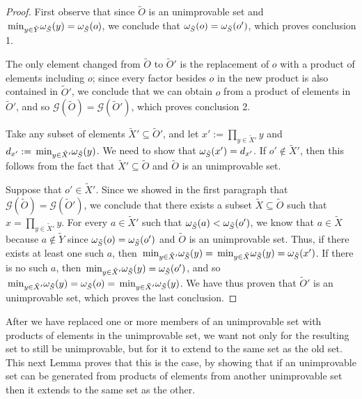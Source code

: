 \documentclass[twocolumn,showpacs,preprintnumbers,amsmath,amssymb,nofootinbib,pra,floatfix]{revtex4-1}
\newenvironment{remark}[1][Remark]{\begin{trivlist}
\item[\hskip \labelsep {\bfseries #1}]}{\end{trivlist}}
\newcommand{\set}{\tilde}
\newcommand{\genfun}{\mathcal{G}}
\begin{document}
\begin{proof}
First observe that since $\set O$ is an unimprovable set and $\min_{y\in\set Y}\om_{\set S}(y)=\om_{\set S}(o)$, we conclude that $\om_{\set S}(o)=\om_{\set S}(o')$, which proves conclusion 1.

The only element changed from $\set O$ to $\set O'$ is the replacement of $o$ with a product of elements including $o$;  since every factor besides $o$ in the new product is also contained in $\set O'$, we conclude that we can obtain $o$ from a product of elements in $\set O'$, and so $\genfun(\set O)=\genfun(\set O')$, which proves conclusion 2.

Take any subset of elements $\set X'\subseteq\set O'$, and let $x' := \prod_{y\in \set X'} y$ and $d_{x'}:=\min_{y\in\set X'}\om_{\set S}(y)$.  We need to show that $\om_{\set S}(x') = d_{x'}$.  If $o'\notin\set X'$, then this follows from the fact that $\set X'\subseteq\set O$ and $\set O$ is an unimprovable set.

Suppose that $o'\in\set X'$. Since we showed in the first paragraph that $\genfun(\set O)=\genfun(\set O')$, we conclude that there exists a subset $\set X\subseteq\set O$ such that $x=\prod_{y\in \set X'}y$.  For every $a\in\set X'$ such that $\om_{\set S}(a)<\om_{\set S}(o')$, we know that $a\in\set X$ because $a\notin\set Y$ since $\om_{\set S}(o)=\om_{\set S}(o')$ and $\set O$ is an unimprovable set.  Thus, if there exists at least one such $a$, then $\min_{y\in\set X'}\om_{\set S}(y)=\min_{y\in\set X}\om_{\set S}(y)=\om_{\set S}(x')$.  If there is no such $a$, then $\min_{y\in\set X'}\om_{\set S}(y)=\om_{\set S}(o')$, and so $\min_{y\in\set X'}\om_{\set S}(y)=\om_{\set S}(o)=\min_{y\in\set X'}\om_{\set S}(y)$.  We have thus proven that $\set O'$ is an unimprovable set, which proves the last conclusion.

\end{proof}
\begin{remark}
After we have replaced one or more members of an unimprovable set with products of elements in the unimprovable set, we want not only for the resulting set to still be unimprovable, but for it to extend to the same set as the old set.  This next Lemma proves that this is the case, by showing that if an unimprovable set can be generated from products of elements from another unimprovable set then it extends to the same set as the other.
\end{remark}
\end{document}
